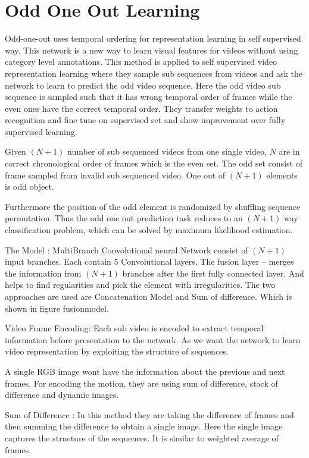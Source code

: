 \section{Odd One Out Learning}

Odd-one-out uses temporal ordering for representation learning in self supervised way.
This network is a new way to learn visual features for videos without using category level annotations. This method is applied to self supervised video representation learning where they sample sub sequences from videos and ask the network to learn to predict the odd video sequence. Here the odd video sub sequence is sampled such that it has wrong temporal order of frames while the even ones have the correct temporal order. 
They transfer weights to action recognition and fine tune on supervised set and show improvement over fully supervised learning.

Given $(N+1)$ number of sub sequenced videos from one single video, $N$ are in correct chronological order of frames which is the even set. The odd set consist of frame sampled from invalid sub sequenced video. One out of $(N+1)$ elements is odd object.

Furthermore the position of the odd element is randomized by shuffling sequence permutation.
Thus the odd one out prediction task reduces to an $(N+1)$ way classification problem, which can be solved by maximum likelihood estimation. 

The Model :  MultiBranch Convolutional neural Network consist of $(N+1)$ input branches. 
Each contain 5 Convolutional layers. 
The fusion layer -- merges the information from $(N+1)$ branches after the first fully connected layer. And helps to find regularities and pick the element with irregularities. The two approaches are used are Concatenation Model and Sum of difference. Which is shown in figure fusionmodel.

Video Frame Encoding: Each sub video is encoded to extract temporal information before presentation to the network. As we want the network to learn video representation by exploiting the structure of sequences. 

A single RGB image wont have the information about the previous and next frames. For encoding the motion, they are using sum of difference, stack of difference and dynamic images.

Sum of Difference : In this method they are taking the difference of frames and then summing the difference to obtain a single image. Here the single image captures the structure of the sequences. 
It is similar to weighted average of frames.

